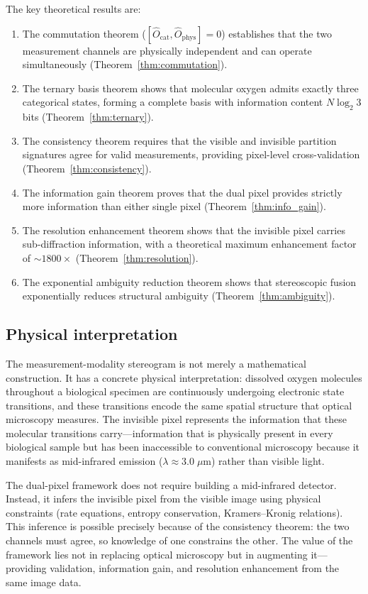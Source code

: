 \documentclass[11pt,twocolumn,a4paper]{article}
\newcommand{\Ocat}{\hat{O}_{\mathrm{cat}}}
\newcommand{\Ophys}{\hat{O}_{\mathrm{phys}}}
\begin{document}
The key theoretical results are:
\begin{enumerate}
\item The commutation theorem ($[\Ocat, \Ophys] = 0$) establishes that the two measurement channels are physically independent and can operate simultaneously (Theorem~\ref{thm:commutation}).
\item The ternary basis theorem shows that molecular oxygen admits exactly three categorical states, forming a complete basis with information content $N\log_2 3$ bits (Theorem~\ref{thm:ternary}).
\item The consistency theorem requires that the visible and invisible partition signatures agree for valid measurements, providing pixel-level cross-validation (Theorem~\ref{thm:consistency}).
\item The information gain theorem proves that the dual pixel provides strictly more information than either single pixel (Theorem~\ref{thm:info_gain}).
\item The resolution enhancement theorem shows that the invisible pixel carries sub-diffraction information, with a theoretical maximum enhancement factor of ${\sim}1800\times$ (Theorem~\ref{thm:resolution}).
\item The exponential ambiguity reduction theorem shows that stereoscopic fusion exponentially reduces structural ambiguity (Theorem~\ref{thm:ambiguity}).
\end{enumerate}

\subsection{Physical interpretation}

The measurement-modality stereogram is not merely a mathematical construction.
It has a concrete physical interpretation: dissolved oxygen molecules throughout a biological specimen are continuously undergoing electronic state transitions, and these transitions encode the same spatial structure that optical microscopy measures.
The invisible pixel represents the information that these molecular transitions carry---information that is physically present in every biological sample but has been inaccessible to conventional microscopy because it manifests as mid-infrared emission ($\lambda \approx 3.0\;\mu$m) rather than visible light.

The dual-pixel framework does not require building a mid-infrared detector.
Instead, it infers the invisible pixel from the visible image using physical constraints (rate equations, entropy conservation, Kramers--Kronig relations).
This inference is possible precisely because of the consistency theorem: the two channels must agree, so knowledge of one constrains the other.
The value of the framework lies not in replacing optical microscopy but in augmenting it---providing validation, information gain, and resolution enhancement from the same image data.
\end{document}
